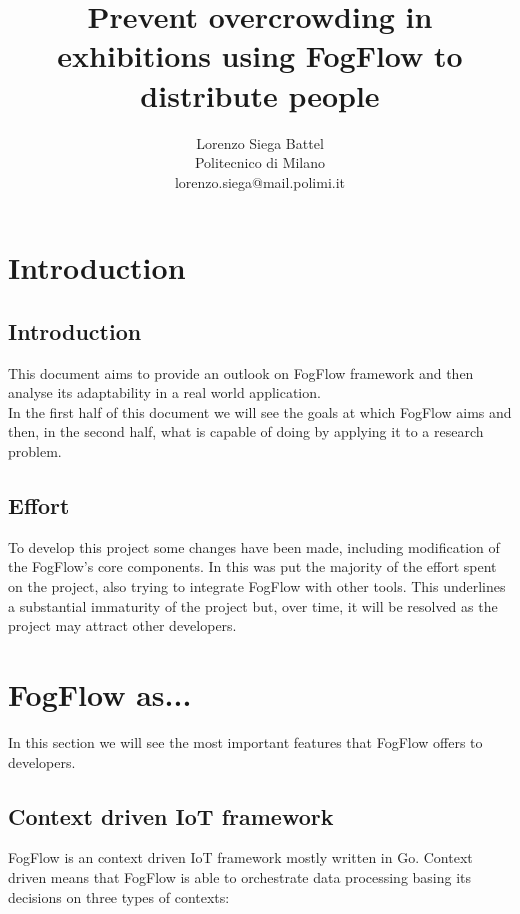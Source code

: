 \documentclass[a4paper]{article}
\title{Prevent overcrowding in exhibitions using FogFlow to distribute people}
\author{Lorenzo Siega Battel\\Politecnico di Milano\\lorenzo.siega@mail.polimi.it}
\date{}
\begin{document}
\maketitle
\newpage
\tableofcontents
\newpage

\section{Introduction}
\subsection{Introduction}
This document aims to provide an outlook on FogFlow framework and then analyse its adaptability in a real world application.\\
In the first half of this document we will see the goals at which FogFlow aims and then, in the second half, what is capable of doing by applying it to a research problem.

\subsection{Effort}
To develop this project some changes have been made, including modification of the FogFlow's core components. In this was put the majority of the effort spent on the project, also trying to integrate FogFlow with other tools. This underlines a substantial immaturity of the project but, over time, it will be resolved as the project may attract other developers.

\newpage
\section{FogFlow as...}
In this section we will see the most important features that FogFlow offers to developers.

\subsection{Context driven IoT framework}
FogFlow is an context driven IoT framework mostly written in Go. Context driven means that FogFlow is able to orchestrate data processing basing its decisions on three types of contexts:
\end{document}
